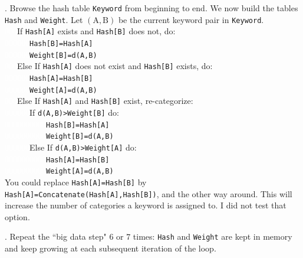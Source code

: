\documentclass[oneside,10pt]{book}
\begin{document}
. Browse the hash table \texttt{Keyword} from beginning to end.
We now build the tables \texttt{Hash} and \texttt{Weight}. Let $(\text{A}, \text{B})$ be the current keyword pair in \texttt{Keyword}. \vspace{1ex}\\
\textcolor{white}{000}If \texttt{Hash[A]} exists and \texttt{Hash[B]} does not, do: \\
\textcolor{white}{000000}\texttt{Hash[B]=Hash[A]} \\
\textcolor{white}{000000}\texttt{Weight[B]=d(A,B) }\\
\textcolor{white}{000}Else If \texttt{Hash[A]} does not exist and \texttt{Hash[B]} exists, do: \\
\textcolor{white}{000000}\texttt{Hash[A]=Hash[B]} \\
\textcolor{white}{000000}\texttt{Weight[A]=d(A,B) } \\
\textcolor{white}{000}Else If \texttt{Hash[A]} and \texttt{Hash[B]} exist, re-categorize: \\
\textcolor{white}{000000}If \texttt{d(A,B)>Weight[B]} do:\\
\textcolor{white}{0000000000}\texttt{Hash[B]=Hash[A]} \\
\textcolor{white}{0000000000}\texttt{Weight[B]=d(A,B)}\\
\textcolor{white}{000000}Else If \texttt{d(A,B)>Weight[A]} do: \\
\textcolor{white}{0000000000}\texttt{Hash[A]=Hash[B]} \\
 \textcolor{white}{0000000000}\texttt{Weight[A]=d(A,B)}\vspace{1ex} \\
\noindent You could replace \texttt{Hash[A]=Hash[B]} by \texttt{Hash[A]=Concatenate(Hash[A],Hash[B])}, and the other way around. This will
 increase the number of categories a keyword is assigned to. I did not test that option.
\vspace{1ex}

. Repeat the ``big data step" $6$ or $7$ times: \texttt{Hash} and \texttt{Weight} are kept in memory and keep growing at each subsequent iteration of the loop.
\vspace{1ex}
\end{document}
